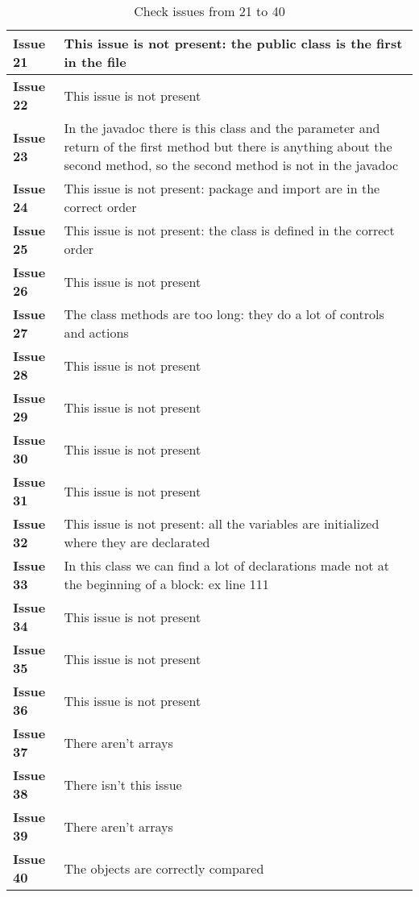 \begin{table}[htbp]
\begin{center}
\renewcommand{\arraystretch}{1.5}
\begin{tabular}{l|p{}}
\hline
\textbf{Issue 21} & This issue is not present: the public class is the first in the file\\
\hline
\textbf{Issue 22} & This issue is not present\\
\hline
\textbf{Issue 23} & In the javadoc there is this class and the parameter and return of the first method but there is anything about the second method, so the second method is not in the javadoc\\
\hline
\textbf{Issue 24} & This issue is not present: package and import are in the correct order\\
\hline
\textbf{Issue 25} & This issue is not present: the class is defined in the correct order\\
\hline
\textbf{Issue 26} & This issue is not present\\
\hline
\textbf{Issue 27} & The class methods are too long: they do a lot of controls and actions\\
\hline
\textbf{Issue 28} & This issue is not present\\
\hline
\textbf{Issue 29} & This issue is not present\\
\hline
\textbf{Issue 30} & This issue is not present\\
\hline
\textbf{Issue 31} & This issue is not present\\
\hline
\textbf{Issue 32} & This issue is not present: all the variables are initialized where they are declarated\\
\hline
\textbf{Issue 33} & In this class we can find a lot of declarations made not at the beginning of a block: ex line 111\\
\hline
\textbf{Issue 34} & This issue is not present\\
\hline
\textbf{Issue 35} & This issue is not present\\
\hline
\textbf{Issue 36} & This issue is not present\\
\hline
\textbf{Issue 37} & There aren't arrays\\
\hline
\textbf{Issue 38} & There isn't this issue\\
\hline
\textbf{Issue 39} & There aren't arrays\\
\hline
\textbf{Issue 40} & The objects are correctly compared\\
\hline
\end{tabular}
\caption{Check issues from 21 to 40}
\end{center}
\end{table}

